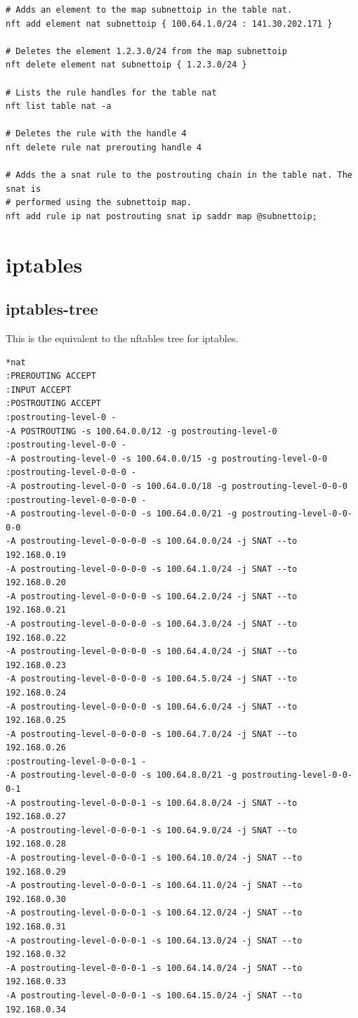 \documentclass{report}
\begin{document}
\begin{verbatim}
# Adds an element to the map subnettoip in the table nat.
nft add element nat subnettoip { 100.64.1.0/24 : 141.30.202.171 }

# Deletes the element 1.2.3.0/24 from the map subnettoip
nft delete element nat subnettoip { 1.2.3.0/24 }

# Lists the rule handles for the table nat
nft list table nat -a

# Deletes the rule with the handle 4
nft delete rule nat prerouting handle 4

# Adds the a snat rule to the postrouting chain in the table nat. The snat is
# performed using the subnettoip map.
nft add rule ip nat postrouting snat ip saddr map @subnettoip;

\end{verbatim}

\section{iptables}

\subsection{iptables-tree}\label{iptables-1}

This is the equivalent to the nftables tree for iptables.

\begin{verbatim}
*nat
:PREROUTING ACCEPT
:INPUT ACCEPT
:POSTROUTING ACCEPT
:postrouting-level-0 -
-A POSTROUTING -s 100.64.0.0/12 -g postrouting-level-0
:postrouting-level-0-0 -
-A postrouting-level-0 -s 100.64.0.0/15 -g postrouting-level-0-0
:postrouting-level-0-0-0 -
-A postrouting-level-0-0 -s 100.64.0.0/18 -g postrouting-level-0-0-0
:postrouting-level-0-0-0-0 -
-A postrouting-level-0-0-0 -s 100.64.0.0/21 -g postrouting-level-0-0-0-0
-A postrouting-level-0-0-0-0 -s 100.64.0.0/24 -j SNAT --to 192.168.0.19
-A postrouting-level-0-0-0-0 -s 100.64.1.0/24 -j SNAT --to 192.168.0.20
-A postrouting-level-0-0-0-0 -s 100.64.2.0/24 -j SNAT --to 192.168.0.21
-A postrouting-level-0-0-0-0 -s 100.64.3.0/24 -j SNAT --to 192.168.0.22
-A postrouting-level-0-0-0-0 -s 100.64.4.0/24 -j SNAT --to 192.168.0.23
-A postrouting-level-0-0-0-0 -s 100.64.5.0/24 -j SNAT --to 192.168.0.24
-A postrouting-level-0-0-0-0 -s 100.64.6.0/24 -j SNAT --to 192.168.0.25
-A postrouting-level-0-0-0-0 -s 100.64.7.0/24 -j SNAT --to 192.168.0.26
:postrouting-level-0-0-0-1 -
-A postrouting-level-0-0-0 -s 100.64.8.0/21 -g postrouting-level-0-0-0-1
-A postrouting-level-0-0-0-1 -s 100.64.8.0/24 -j SNAT --to 192.168.0.27
-A postrouting-level-0-0-0-1 -s 100.64.9.0/24 -j SNAT --to 192.168.0.28
-A postrouting-level-0-0-0-1 -s 100.64.10.0/24 -j SNAT --to 192.168.0.29
-A postrouting-level-0-0-0-1 -s 100.64.11.0/24 -j SNAT --to 192.168.0.30
-A postrouting-level-0-0-0-1 -s 100.64.12.0/24 -j SNAT --to 192.168.0.31
-A postrouting-level-0-0-0-1 -s 100.64.13.0/24 -j SNAT --to 192.168.0.32
-A postrouting-level-0-0-0-1 -s 100.64.14.0/24 -j SNAT --to 192.168.0.33
-A postrouting-level-0-0-0-1 -s 100.64.15.0/24 -j SNAT --to 192.168.0.34
\end{verbatim}
\end{document}

